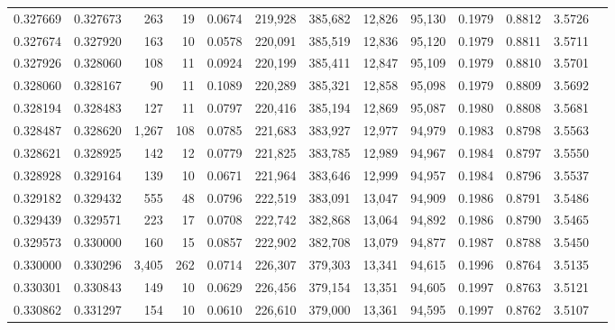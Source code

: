 \begin{tabular}{rrrrrrrrrrrrr}
0.327669 & 0.327673 &   263 &  19 &                                     0.0674 & 219,928 & 385,682 &  12,826 &  95,130 & 0.1979 & 0.8812 & 3.5726 \\
0.327674 & 0.327920 &   163 &  10 &                                     0.0578 & 220,091 & 385,519 &  12,836 &  95,120 & 0.1979 & 0.8811 & 3.5711 \\
0.327926 & 0.328060 &   108 &  11 &                                     0.0924 & 220,199 & 385,411 &  12,847 &  95,109 & 0.1979 & 0.8810 & 3.5701 \\
0.328060 & 0.328167 &    90 &  11 &                                     0.1089 & 220,289 & 385,321 &  12,858 &  95,098 & 0.1979 & 0.8809 & 3.5692 \\
0.328194 & 0.328483 &   127 &  11 &                                     0.0797 & 220,416 & 385,194 &  12,869 &  95,087 & 0.1980 & 0.8808 & 3.5681 \\
0.328487 & 0.328620 & 1,267 & 108 &                                     0.0785 & 221,683 & 383,927 &  12,977 &  94,979 & 0.1983 & 0.8798 & 3.5563 \\
0.328621 & 0.328925 &   142 &  12 &                                     0.0779 & 221,825 & 383,785 &  12,989 &  94,967 & 0.1984 & 0.8797 & 3.5550 \\
0.328928 & 0.329164 &   139 &  10 &                                     0.0671 & 221,964 & 383,646 &  12,999 &  94,957 & 0.1984 & 0.8796 & 3.5537 \\
0.329182 & 0.329432 &   555 &  48 &                                     0.0796 & 222,519 & 383,091 &  13,047 &  94,909 & 0.1986 & 0.8791 & 3.5486 \\
0.329439 & 0.329571 &   223 &  17 &                                     0.0708 & 222,742 & 382,868 &  13,064 &  94,892 & 0.1986 & 0.8790 & 3.5465 \\
0.329573 & 0.330000 &   160 &  15 &                                     0.0857 & 222,902 & 382,708 &  13,079 &  94,877 & 0.1987 & 0.8788 & 3.5450 \\
0.330000 & 0.330296 & 3,405 & 262 &                                     0.0714 & 226,307 & 379,303 &  13,341 &  94,615 & 0.1996 & 0.8764 & 3.5135 \\
0.330301 & 0.330843 &   149 &  10 &                                     0.0629 & 226,456 & 379,154 &  13,351 &  94,605 & 0.1997 & 0.8763 & 3.5121 \\
0.330862 & 0.331297 &   154 &  10 &                                     0.0610 & 226,610 & 379,000 &  13,361 &  94,595 & 0.1997 & 0.8762 & 3.5107 \\

\end{tabular}
